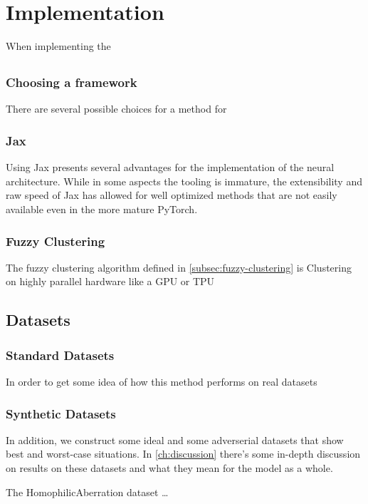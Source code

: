 \documentclass[../main.tex]{subfiles}
\begin{document}
    \chapter{Implementation}\label{ch:implementation}
    When implementing the



    \section{}\label{sec:technical-hurdles}

    \subsection{Choosing a framework}\label{subsec:choosing-a-framework}
    There are several possible choices for a method for

    \subsection{Jax}\label{subsec:jax}
    Using Jax presents several advantages for the implementation of the neural architecture.
    While in some aspects the tooling is immature, the extensibility and raw speed of Jax has allowed for well optimized methods that are not easily available even in the more mature PyTorch.

    \subsection{Fuzzy Clustering}\label{subsec:implementing-fuzzy-clustering}
    The fuzzy clustering algorithm defined in \autoref{subsec:fuzzy-clustering} is
    Clustering on highly parallel hardware like a GPU or TPU


    \section{Datasets}\label{sec:datasets}
    \subsection{Standard Datasets}\label{subsec:standard-datasets}
    In order to get some idea of how this method performs on real datasets

    \subsection{Synthetic Datasets}\label{subsec:synthetic-datasets}
    In addition, we construct some ideal and some adverserial datasets that show best and worst-case situations.
    In \autoref{ch:discussion} there's some in-depth discussion on results on these datasets and what they mean for the model as a whole.

    The HomophilicAberration dataset \ldots {}

\end{document}
